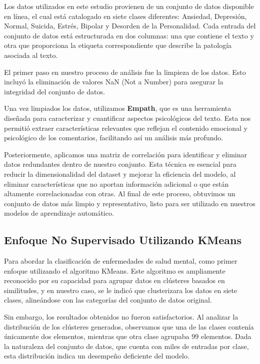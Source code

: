 \documentclass[
10pt, %
a4paper, %
oneside, %
headinclude,footinclude, %
BCOR5mm, %
]{scrartcl}
\begin{document}
Los datos utilizados en este estudio provienen de un conjunto de datos disponible en línea, el cual está catalogado en siete clases diferentes: 
Ansiedad, Depresión, Normal, Suicida, Estrés, Bipolar y Desorden de la Personalidad. Cada entrada del conjunto de datos está estructurada en dos columnas: 
una que contiene el texto y otra que proporciona la etiqueta correspondiente que describe la patología asociada al texto.

El primer paso en nuestro proceso de análisis fue la limpieza de los datos. Esto incluyó la eliminación de valores NaN (Not a Number) para asegurar la integridad del conjunto de datos. 

Una vez limpiados los datos, utilizamos \textbf{Empath}, que es una herramienta diseñada para caracterizar y cuantificar aspectos psicológicos del texto. 
Esta nos permitió extraer características relevantes que reflejan el contenido emocional y psicológico de los comentarios, facilitando así un análisis más profundo.

Posteriormente, aplicamos una matriz de correlación para identificar y eliminar datos redundantes dentro de nuestro conjunto. 
Esta técnica es esencial para reducir la dimensionalidad del dataset y mejorar la eficiencia del modelo, al eliminar características que no aportan información adicional o que están altamente correlacionadas con otras. 
Al final de este proceso, obtuvimos un conjunto de datos más limpio y representativo, listo para ser utilizado en nuestros modelos de aprendizaje automático.


\subsection{Enfoque No Supervisado Utilizando KMeans}

Para abordar la clasificación de enfermedades de salud mental, como primer enfoque utilizando el algoritmo KMeans. Este algoritmo es ampliamente reconocido por su capacidad para agrupar datos en clústeres basados en similitudes, 
y en nuestro caso, se le indicó que clusterizara los datos en siete clases, alineándose con las categorías del conjunto de datos original.

Sin embargo, los resultados obtenidos no fueron satisfactorios. Al analizar la distribución de los clústeres generados, observamos que una de las clases contenía únicamente dos elementos, mientras que otra clase agrupaba 99 elementos. 
Dada la naturaleza del conjunto de datos, que cuenta con miles de entradas por clase, esta distribución indica un desempeño deficiente del modelo.
\end{document}
